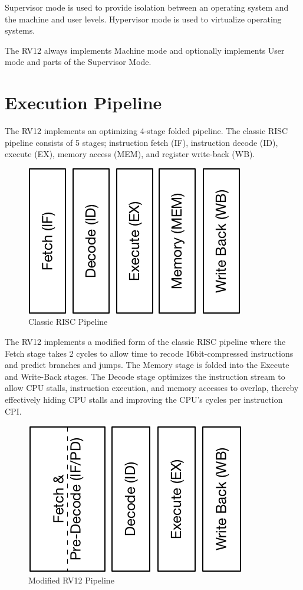 Supervisor mode is used to provide isolation between an operating system and the machine and user levels. 
Hypervisor mode is used to virtualize operating systems.

The RV12 always implements Machine mode and optionally implements User mode and parts of the Supervisor Mode.

\section{Execution Pipeline}\label{execution-pipeline}

The RV12 implements an optimizing 4-stage folded pipeline. 
The classic RISC pipeline consists of 5 stages; instruction fetch (IF), instruction decode (ID), execute (EX), memory access (MEM), and register write-back (WB).

\begin{figure}[hbt]
  \includegraphics{assets/img/Pipeline-Reg}
  \caption{Classic RISC Pipeline}
\end{figure}

The RV12 implements a modified form of the classic RISC pipeline where the Fetch stage takes 2 cycles to allow time to recode 16bit-compressed instructions and predict branches and jumps. 
The Memory stage is folded into the Execute and Write-Back stages. 
The Decode stage optimizes the instruction stream to allow CPU stalls, instruction execution, and memory accesses to overlap, thereby effectively hiding CPU stalls and improving the CPU's cycles per instruction CPI.

\begin{figure}[hbt]
  \includegraphics{assets/img/Pipeline-RV12}
  \caption{Modified RV12 Pipeline}
\end{figure}

